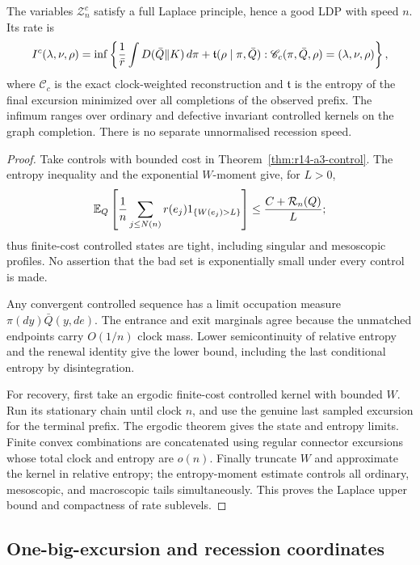 \begin{theorem}
\label{thm:r14-a3-collision}
The variables \(\mathcal Z_n^c\) satisfy a full Laplace principle, hence a
good LDP with speed \(n\).  Its rate is
\[
 I^c(\lambda,\nu,\rho)
 =
 \inf\left\{
 {1\over\bar r}\int D(\bar Q\Vert K)\,d\pi
 +\mathfrak t(\rho\mid\pi,\bar Q):
 \mathscr C_c(\pi,\bar Q,\rho)=(\lambda,\nu,\rho)
 \right\},
\]
where \(\mathscr C_c\) is the exact clock-weighted reconstruction and
\(\mathfrak t\) is the entropy of the final excursion minimized over all
completions of the observed prefix.  The infimum ranges over ordinary and
defective invariant controlled kernels on the graph completion.  There is no
separate unnormalised recession speed.
\end{theorem}

\begin{proof}
Take controls with bounded cost in
Theorem~\ref{thm:r14-a3-control}.  The entropy inequality and the exponential
\(W\)-moment give, for \(L>0\),
\[
 \mathbb E_Q\left[{1\over n}
  \sum_{j\le N(n)}r(e_j)1_{\{W(e_j)>L\}}\right]
 \le {C+\mathcal R_n(Q)\over L};
\]
thus finite-cost controlled states are tight, including singular and
mesoscopic profiles.  No assertion that the bad set is exponentially small
under every control is made.

Any convergent controlled sequence has a limit occupation measure
\(\pi(dy)\bar Q(y,de)\).  The entrance and exit marginals agree because the
unmatched endpoints carry \(O(1/n)\) clock mass.  Lower semicontinuity of
relative entropy and the renewal identity give the lower bound, including
the last conditional entropy by disintegration.

For recovery, first take an ergodic finite-cost controlled kernel with bounded
\(W\).  Run its stationary chain until clock \(n\), and use the genuine last
sampled excursion for the terminal prefix.  The ergodic theorem gives the
state and entropy limits.  Finite convex combinations are concatenated using
regular connector excursions whose total clock and entropy are \(o(n)\).
Finally truncate \(W\) and approximate the kernel in relative entropy; the
entropy-moment estimate controls all ordinary, mesoscopic, and macroscopic
tails simultaneously.  This proves the Laplace upper bound and compactness of
rate sublevels.
\end{proof}

\subsection{One-big-excursion and recession coordinates}

